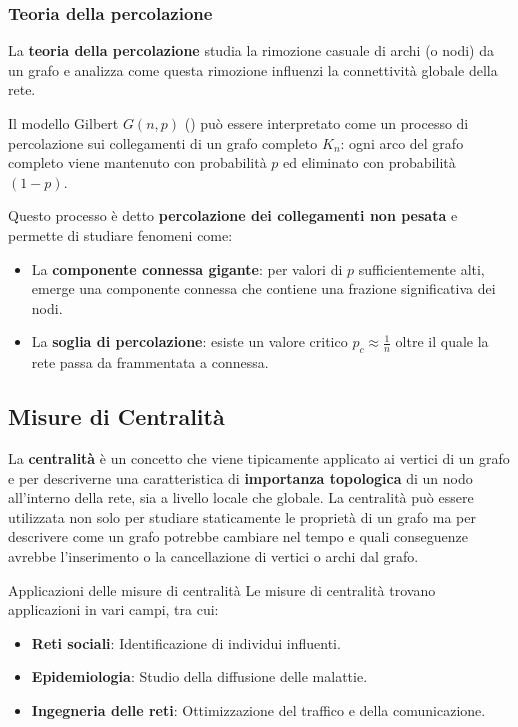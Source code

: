 \subsubsection{Teoria della percolazione}
La \textbf{teoria della percolazione} studia la rimozione casuale di archi
(o nodi) da un grafo e analizza come questa rimozione influenzi la
connettività globale della rete.

Il modello Gilbert $G(n, p)$ () può essere interpretato
come un processo di percolazione sui collegamenti di un grafo completo $K_n$:
ogni arco del grafo completo viene mantenuto con probabilità $p$ ed eliminato
con probabilità $(1-p)$.

Questo processo è detto \textbf{percolazione dei collegamenti non pesata} e
permette di studiare fenomeni come:
\begin{itemize}
    \item La \textbf{componente connessa gigante}: per valori di $p$ sufficientemente
    alti, emerge una componente connessa che contiene una frazione significativa
    dei nodi.
    \item La \textbf{soglia di percolazione}: esiste un valore critico
    $p_c \approx \frac{1}{n}$ oltre il quale la rete passa da frammentata a
    connessa.
\end{itemize}


\subsection{Misure di Centralità}

La \textbf{centralità} è un concetto che viene tipicamente applicato ai
vertici di un grafo e per descriverne una caratteristica di
\textbf{importanza topologica} di un nodo all'interno della rete,
sia a livello locale che globale.
La centralità può essere utilizzata non solo per studiare staticamente le
proprietà di un grafo ma per descrivere come un grafo potrebbe cambiare
nel tempo e quali conseguenze avrebbe l'inserimento o la cancellazione di
vertici o archi dal grafo.

\begin{nota}{Applicazioni delle misure di centralità}{}
    Le misure di centralità trovano applicazioni in vari campi, tra cui:
    \begin{itemize}
        \item \textbf{Reti sociali}: Identificazione di individui influenti.
        \item \textbf{Epidemiologia}: Studio della diffusione delle malattie.
        \item \textbf{Ingegneria delle reti}: Ottimizzazione del traffico e della
        comunicazione.
    \end{itemize}
\end{nota}

